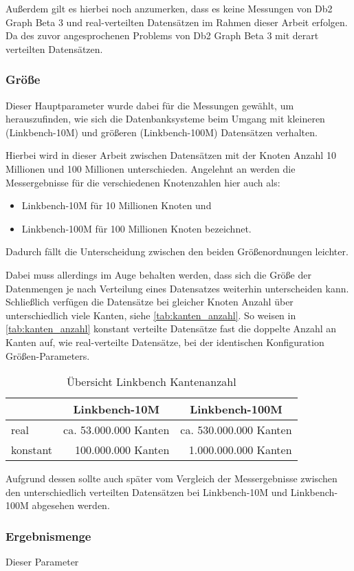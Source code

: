 Außerdem gilt es hierbei noch anzumerken, dass es keine Messungen von Db2 Graph Beta 3 und real-verteilten Datensätzen im Rahmen dieser Arbeit erfolgen. Da des zuvor angesprochenen Problems von Db2 Graph Beta 3 mit derart verteilten Datensätzen.

\subsubsection{Größe}
Dieser Hauptparameter wurde dabei für die Messungen gewählt, um herauszufinden, wie sich die Datenbanksysteme beim Umgang mit kleineren (Linkbench-10M) und größeren (Linkbench-100M) Datensätzen verhalten. 

Hierbei wird in dieser Arbeit zwischen Datensätzen mit der Knoten Anzahl 10 Millionen und 100 Millionen unterschieden. Angelehnt an \cite{sigmod_tian} werden die Messergebnisse für die verschiedenen Knotenzahlen hier auch als:
\begin{itemize}
    \item Linkbench-10M für 10 Millionen Knoten und 
    \item Linkbench-100M für 100 Millionen Knoten bezeichnet.
\end{itemize}
Dadurch fällt die Unterscheidung zwischen den beiden Größenordnungen leichter. 

Dabei muss allerdings im Auge behalten werden, dass sich die Größe der Datenmengen je nach Verteilung eines Datensatzes weiterhin unterscheiden kann. Schließlich verfügen die Datensätze bei gleicher Knoten Anzahl über unterschiedlich viele Kanten, siehe \autoref{tab:kanten_anzahl}. So weisen in \autoref{tab:kanten_anzahl} konstant verteilte Datensätze fast die doppelte Anzahl an Kanten auf, wie real-verteilte Datensätze, bei der identischen Konfiguration Größen-Parameters. 

\begin{table}[ht]
    \centering
    \begin{tabular}{l|r|r}
    \hline
    \rowcolor[HTML]{EFEFEF} 
    \multicolumn{1}{c|}{\cellcolor[HTML]{EFEFEF}\textbf{Verteilung}} & \multicolumn{1}{c|}{\cellcolor[HTML]{EFEFEF}\textbf{Linkbench-10M}} & \multicolumn{1}{c}{\cellcolor[HTML]{EFEFEF}\textbf{Linkbench-100M}} \\ \hline
    real & ca. 53.000.000 Kanten & ca. 530.000.000 Kanten \\
    konstant & 100.000.000 Kanten & 1.000.000.000 Kanten \\ \hline
    \end{tabular}
    \caption{Übersicht Linkbench Kantenanzahl}
    \label{tab:kanten_anzahl}
    \vspace{1em}
    \textit{}
\end{table}

Aufgrund dessen sollte auch später vom Vergleich der Messergebnisse zwischen den unterschiedlich verteilten Datensätzen bei Linkbench-10M und Linkbench-100M abgesehen werden.
\subsubsection{Ergebnismenge}
Dieser Parameter 